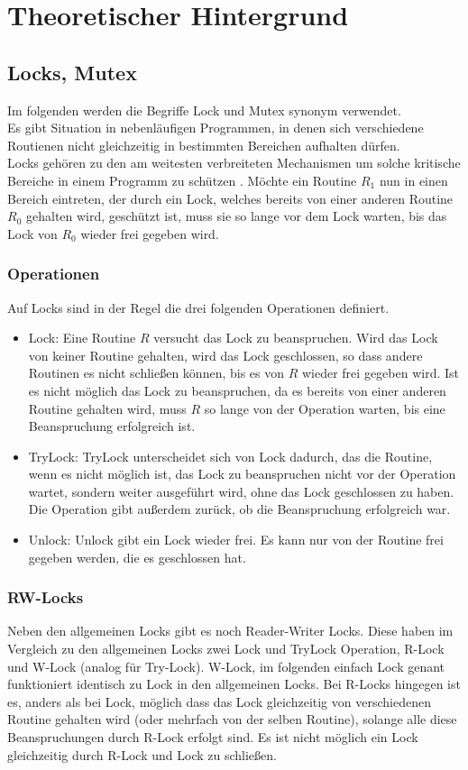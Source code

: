\chapter{Theoretischer Hintergrund}

\section{Locks, Mutex}
Im folgenden werden die Begriffe Lock und Mutex synonym verwendet.\\
Es gibt Situation in nebenläufigen Programmen, in denen sich verschiedene 
Routienen nicht gleichzeitig in bestimmten Bereichen aufhalten dürfen.\\
Locks gehören zu den am weitesten verbreiteten Mechanismen um solche kritische 
Bereiche in einem Programm zu schützen \cite{zhou}.
Möchte ein Routine $R_1$ nun in einen Bereich 
eintreten, der durch ein Lock, welches bereits von einer anderen Routine $R_0$ 
gehalten wird, geschützt ist, muss sie so lange vor dem Lock warten, bis das Lock 
von $R_0$ wieder frei gegeben wird.
\subsection{Operationen}
Auf Locks sind in der Regel die drei folgenden Operationen definiert.
\begin{itemize}
    \item Lock: Eine Routine $R$ versucht das Lock zu beanspruchen. Wird das Lock 
        von keiner Routine gehalten, wird das Lock geschlossen, so dass andere 
        Routinen es nicht schließen können, bis es von $R$ wieder frei gegeben 
        wird. Ist es nicht möglich das Lock zu beanspruchen, da es bereits von 
        einer anderen Routine gehalten wird, muss $R$ so lange von der Operation 
        warten, bis eine Beanspruchung erfolgreich ist.
    \item TryLock: TryLock unterscheidet sich von Lock dadurch, das die Routine,
        wenn es nicht möglich ist, das Lock zu beanspruchen nicht vor der 
        Operation wartet, sondern weiter ausgeführt wird, ohne das Lock geschlossen
        zu haben. Die Operation gibt außerdem zurück, ob die Beanspruchung 
        erfolgreich war.
    \item Unlock: Unlock gibt ein Lock wieder frei. Es kann nur von der Routine 
        frei gegeben werden, die es geschlossen hat.
\end{itemize}
\subsection{RW-Locks}
Neben den allgemeinen Locks gibt es noch Reader-Writer Locks. Diese haben im 
Vergleich zu den allgemeinen Locks zwei Lock und TryLock Operation, R-Lock und 
W-Lock (analog für Try-Lock). W-Lock, im folgenden einfach Lock genant funktioniert 
identisch zu Lock in den allgemeinen Locks. Bei R-Locks hingegen ist es, anders 
als bei Lock, möglich dass das Lock gleichzeitig von verschiedenen Routine gehalten wird
(oder mehrfach von der selben Routine), solange alle diese Beanspruchungen durch 
R-Lock erfolgt sind. Es ist nicht möglich ein Lock gleichzeitig durch R-Lock und 
Lock zu schließen.

